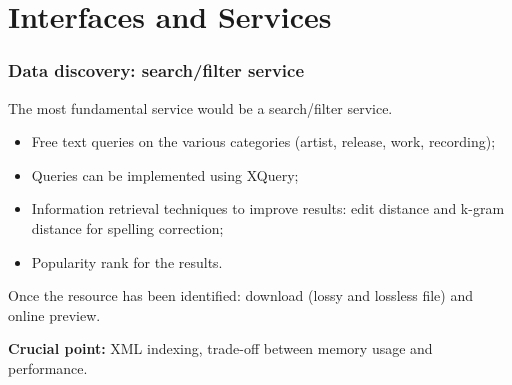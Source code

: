 \documentclass{beamer}
\newcommand\rb[1]{\textcolor{ThemeRed}{\textbf{#1}}}
\begin{document}
\section{Interfaces and Services}

  \begin{frame}
    \frametitle{Data discovery: search/filter service}

    The most fundamental service would be a search/filter service.

    \vspace{0.5em}

    \begin{itemize}
      \item Free text queries on the various categories (artist, release, work, recording);
      \item Queries can be implemented using XQuery;
      \item Information retrieval techniques to improve results: edit distance and k-gram distance for spelling correction;
      \item Popularity rank for the results.
    \end{itemize}


    \vspace{1em}

    Once the resource has been identified: download (lossy and lossless file) and online preview.

    \vspace{1em}

    \rb{Crucial point:} XML indexing, trade-off between memory usage and performance.

  \end{frame}
\end{document}

